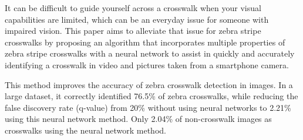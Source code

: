 It can be difficult to guide yourself across a crosswalk when your visual capabilities are limited, which can be an everyday issue for someone with impaired vision. This paper aims to alleviate that issue for zebra stripe crosswalks by proposing an algorithm that incorporates multiple properties of zebra stripe crosswalks with a neural network to assist in quickly and accurately identifying a crosswalk in video and pictures taken from a smartphone camera.

This method improves the accuracy of zebra crosswalk detection in images. In a large dataset, it correctly identified 76.5\% of zebra crosswalks, while reducing the false discovery rate (q-value) from 20\% without using neural networks to 2.21\% using this neural network method. Only 2.04\% of non-crosswalk images as crosswalks using the neural network method.